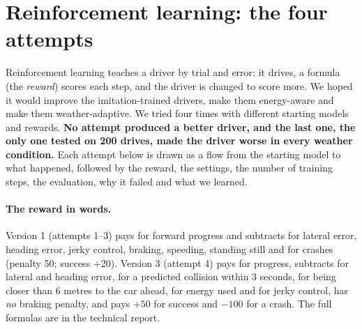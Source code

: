 \section{Reinforcement learning: the four attempts}\label{sec:g-rl}

\begin{plainwords}
Reinforcement learning teaches a driver by trial and error: it drives, a formula (the \emph{reward}) scores each step, and the driver is changed to score more. We hoped it would improve the imitation-trained drivers, make them energy-aware and make them weather-adaptive. We tried four times with different starting models and rewards. \textbf{No attempt produced a better driver, and the last one, the only one tested on 200 drives, made the driver worse in every weather condition.}
Each attempt below is drawn as a flow from the starting model to what happened, followed by the reward, the settings, the number of training steps, the evaluation, why it failed and what we learned.
\end{plainwords}

\paragraph{The reward in words.} Version 1 (attempts 1--3) pays for forward progress and subtracts for lateral error, heading error, jerky control, braking, speeding, standing still and for crashes (penalty 50; success +20). Version 3 (attempt 4) pays for progress, subtracts for lateral and heading error, for a predicted collision within 3 seconds, for being closer than 6 metres to the car ahead, for energy used and for jerky control, has \emph{no} braking penalty, and pays $+50$ for success and $-100$ for a crash. The full formulas are in the technical report.

